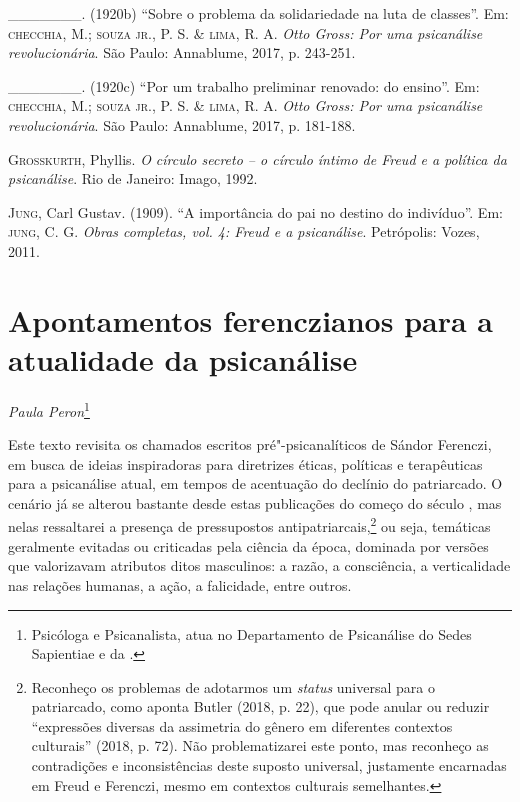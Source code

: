\begin{Parskip}
\_\_\_\_\_\_\_. (1920b) ``Sobre o problema da solidariedade na luta de classes''. Em: \textsc{checchia}, M.; \textsc{souza jr.}, P. S. \& \textsc{lima}, R. A. \emph{Otto Gross: Por uma psicanálise revolucionária}. São Paulo: Annablume, 2017, p. 243-251.

\_\_\_\_\_\_\_. (1920c) ``Por um trabalho preliminar renovado: do ensino''. Em: \textsc{checchia}, M.; \textsc{souza jr.}, P. S. \& \textsc{lima}, R. A. \emph{Otto Gross: Por uma psicanálise revolucionária}. São Paulo: Annablume, 2017, p. 181-188.

\textsc{Grosskurth}, Phyllis. \emph{O círculo secreto -- o círculo íntimo de Freud e a política da psicanálise}. Rio de Janeiro: Imago, 1992.

\textsc{Jung}, Carl Gustav. (1909). ``A importância do pai no destino do indivíduo''. Em: \textsc{jung}, C. G. \emph{Obras completas, vol. 4: Freud e a psicanálise}. Petrópolis: Vozes, 2011.

\end{Parskip}


\chapter*{Apontamentos ferenczianos para a atualidade da psicanálise}

\begin{flushright}
\emph{Paula Peron}\footnote{Psicóloga e Psicanalista, atua no Departamento de Psicanálise do
Sedes Sapientiae e da .}
\end{flushright}

Este texto revisita os chamados escritos pré"-psicanalíticos de Sándor
Ferenczi, em busca de ideias inspiradoras para diretrizes éticas,
políticas e terapêuticas para a psicanálise atual, em tempos de
acentuação do declínio do patriarcado. O cenário já se alterou bastante
desde estas publicações do começo do século , mas nelas ressaltarei a
presença de pressupostos antipatriarcais,\footnote{Reconheço os problemas
  de adotarmos um \emph{status} universal para o patriarcado, como
  aponta Butler (2018, p. 22), que pode anular ou reduzir ``expressões
  diversas da assimetria do gênero em diferentes contextos culturais''
  (2018, p. 72). Não problematizarei este ponto, mas reconheço as
  contradições e inconsistências deste suposto universal, justamente
  encarnadas em Freud e Ferenczi, mesmo em contextos culturais
  semelhantes.} ou seja, temáticas geralmente evitadas ou criticadas
pela ciência da época, dominada por versões que valorizavam atributos
ditos masculinos: a razão, a consciência, a verticalidade nas relações
humanas, a ação, a falicidade, entre outros.

